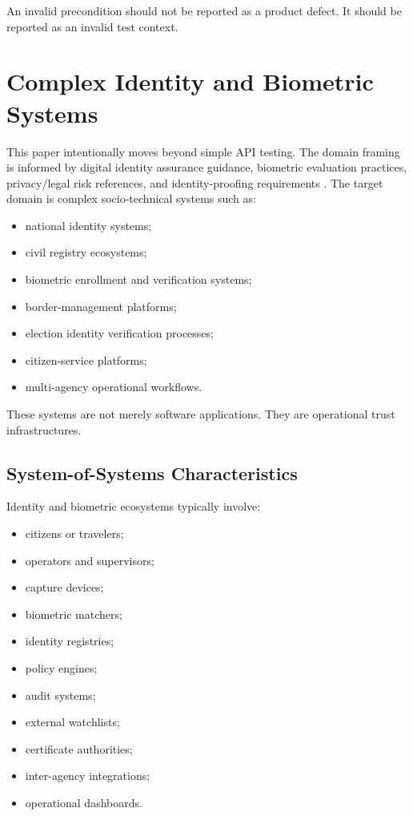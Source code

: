 \documentclass[11pt,a4paper]{article}
\begin{document}
An invalid precondition should not be reported as a product defect. It should be reported as an invalid test context.

\section{Complex Identity and Biometric Systems}

This paper intentionally moves beyond simple API testing. The domain framing is informed by digital identity assurance guidance, biometric evaluation practices, privacy/legal risk references, and identity-proofing requirements \cite{nist80063,nistbio,cnilbio,iso30107,iso301073,etsi119461}. The target domain is complex socio-technical systems such as:
\begin{itemize}
\item national identity systems;
\item civil registry ecosystems;
\item biometric enrollment and verification systems;
\item border-management platforms;
\item election identity verification processes;
\item citizen-service platforms;
\item multi-agency operational workflows.
\end{itemize}

These systems are not merely software applications. They are operational trust infrastructures.

\subsection{System-of-Systems Characteristics}

Identity and biometric ecosystems typically involve:
\begin{itemize}
\item citizens or travelers;
\item operators and supervisors;
\item capture devices;
\item biometric matchers;
\item identity registries;
\item policy engines;
\item audit systems;
\item external watchlists;
\item certificate authorities;
\item inter-agency integrations;
\item operational dashboards.
\end{itemize}
\end{document}
